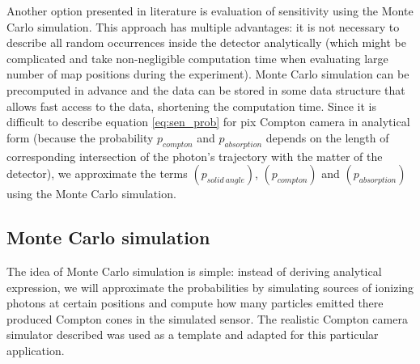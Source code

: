 Another option presented in literature is evaluation of sensitivity using the Monte Carlo simulation.
This approach has multiple advantages: it is not necessary to describe all random occurrences inside the detector analytically (which might be complicated and take non-negligible computation time when evaluating large number of map positions during the experiment).
Monte Carlo simulation can be precomputed in advance and the data can be stored in some data structure that allows fast access to the data, shortening the computation time.
Since it is difficult to describe  equation \ref{eq:sen_prob} for \ac{pix} Compton camera in analytical form 
(because the probability $p_{compton}$ and $p_{absorption}$ depends on the length of corresponding intersection of the photon's trajectory with the matter of the detector),
we approximate the terms $(p_{solid\ angle})$, $(p_{compton})$ and $(p_{absorption})$ using the Monte Carlo simulation.%



\subsection{Monte Carlo simulation}%
The idea of Monte Carlo simulation is simple:
instead of deriving analytical expression,
we will approximate the probabilities by simulating sources of ionizing photons at certain positions and compute how many particles emitted there produced Compton cones in the simulated sensor.
The realistic Compton camera simulator described \cite{baca2019timepix} was used as a template and adapted for this particular application.

